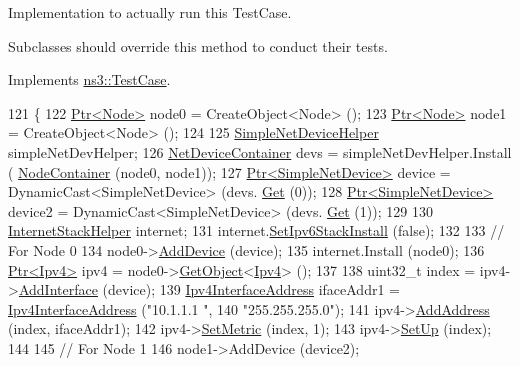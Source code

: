 Implementation to actually run this Test\+Case. 

Subclasses should override this method to conduct their tests. 

Implements \hyperlink{classns3_1_1TestCase_a8ff74680cf017ed42011e4be51917a24}{ns3\+::\+Test\+Case}.


\begin{DoxyCode}
121 \{
122   \hyperlink{classns3_1_1Ptr}{Ptr<Node>} node0 = CreateObject<Node> ();
123   \hyperlink{classns3_1_1Ptr}{Ptr<Node>} node1 = CreateObject<Node> ();
124 
125   \hyperlink{classns3_1_1SimpleNetDeviceHelper}{SimpleNetDeviceHelper} simpleNetDevHelper;
126   \hyperlink{classns3_1_1NetDeviceContainer}{NetDeviceContainer} devs = simpleNetDevHelper.Install (
      \hyperlink{classns3_1_1NodeContainer}{NodeContainer} (node0, node1));
127   \hyperlink{classns3_1_1Ptr}{Ptr<SimpleNetDevice>} device = DynamicCast<SimpleNetDevice> (devs.
      \hyperlink{classns3_1_1NetDeviceContainer_a677d62594b5c9d2dea155cc5045f4d0b}{Get} (0));
128   \hyperlink{classns3_1_1Ptr}{Ptr<SimpleNetDevice>} device2 = DynamicCast<SimpleNetDevice> (devs.
      \hyperlink{classns3_1_1NetDeviceContainer_a677d62594b5c9d2dea155cc5045f4d0b}{Get} (1));
129 
130   \hyperlink{classns3_1_1InternetStackHelper}{InternetStackHelper} internet;
131   internet.\hyperlink{classns3_1_1InternetStackHelper_a5fa8d34e5834305b6aa1b0fe43e1132b}{SetIpv6StackInstall} (\textcolor{keyword}{false});
132 
133   \textcolor{comment}{// For Node 0}
134   node0->\hyperlink{classns3_1_1Node_a42ff83ee1d5d1649c770d3f5b62375de}{AddDevice} (device);
135   internet.Install (node0);
136   \hyperlink{classns3_1_1Ptr}{Ptr<Ipv4>} ipv4 = node0->\hyperlink{classns3_1_1Object_a13e18c00017096c8381eb651d5bd0783}{GetObject}<\hyperlink{classns3_1_1Ipv4}{Ipv4}> ();
137 
138   uint32\_t index = ipv4->\hyperlink{classns3_1_1Ipv4_a637354128b71bc587ea5a6eeaef42469}{AddInterface} (device);
139   \hyperlink{classns3_1_1Ipv4InterfaceAddress}{Ipv4InterfaceAddress} ifaceAddr1 = \hyperlink{classns3_1_1Ipv4InterfaceAddress}{Ipv4InterfaceAddress} (\textcolor{stringliteral}{"10.1.1.1
      "},
140                                                           \textcolor{stringliteral}{"255.255.255.0"});
141   ipv4->\hyperlink{classns3_1_1Ipv4_ad203526cae6a4b86f1bb89e44d2b62f7}{AddAddress} (index, ifaceAddr1);
142   ipv4->\hyperlink{classns3_1_1Ipv4_a2b5632573b67957fabe2dfea248a57a3}{SetMetric} (index, 1);
143   ipv4->\hyperlink{classns3_1_1Ipv4_a71b2f8acca4923aef907b50b3196bf23}{SetUp} (index);
144 
145   \textcolor{comment}{// For Node 1}
146   node1->AddDevice (device2);

\end{DoxyCode}
